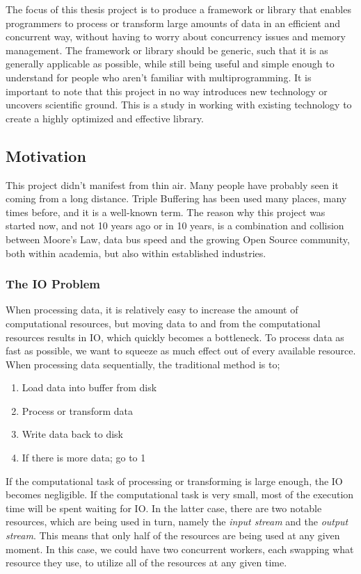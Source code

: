 \documentclass[a4paper]{article}
\begin{document}
The focus of this thesis project is to produce a framework or library that enables programmers to process or transform large amounts of data in an efficient and concurrent way, without having to worry about concurrency issues and memory management. The framework or library should be generic, such that it is as generally applicable as possible, while still being useful and simple enough to understand for people who aren't familiar with multiprogramming. It is important to note that this project in no way introduces new technology or uncovers scientific ground. This is a study in working with existing technology to create a highly optimized and effective library.



\subsection{Motivation}
This project didn't manifest from thin air. Many people have probably seen it coming from a long distance. Triple Buffering has been used many places, many times before, and it is a well-known term. The reason why this project was started now, and not 10 years ago or in 10 years, is a combination and collision between Moore's Law, data bus speed and the growing Open Source community, both within academia, but also within established industries.


\subsubsection{The IO Problem}
When processing data, it is relatively easy to increase the amount of computational resources, but moving data to and from the computational resources results in IO, which quickly becomes a bottleneck. To process data as fast as possible, we want to squeeze as much effect out of every available resource. When processing data sequentially, the traditional method is to;

\begin{enumerate}
\item Load data into buffer from disk
\item Process or transform data
\item Write data back to disk
\item If there is more data; go to 1
\end{enumerate}

If the computational task of processing or transforming is large enough, the IO becomes negligible. If the computational task is very small, most of the execution time will be spent waiting for IO. In the latter case, there are two notable resources, which are being used in turn, namely the \textit{input stream} and the \textit{output stream}. This means that only half of the resources are being used at any given moment. In this case, we could have two concurrent workers, each swapping what resource they use, to utilize all of the resources at any given time.
\end{document}
